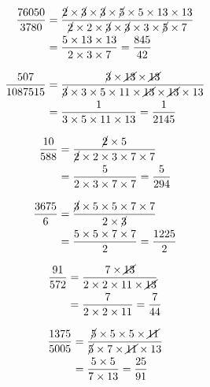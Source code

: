 {{\item\begin{align*}
    \frac{76050}{3780} &=
    \frac{\cancel{2} \times \cancel{3} \times \cancel{3} \times \cancel{5} \times 5 \times 13 \times 13}
    {\cancel{2} \times 2 \times \cancel{3} \times \cancel{3} \times 3 \times \cancel{5} \times 7}\\ &=
    \frac{5 \times 13 \times 13}
    {2 \times 3 \times 7} =
    \frac{845}{42}
    \end{align*}

\item\begin{align*}
    \frac{507}{1087515} &=
    \frac{\cancel{3} \times \cancel{13} \times \cancel{13}}
    {\cancel{3} \times 3 \times 5 \times 11 \times \cancel{13} \times \cancel{13} \times 13}\\ &=
    \frac{1}
    {3 \times 5 \times 11 \times 13} =
    \frac{1}{2145}
    \end{align*}

\item\begin{align*}
    \frac{10}{588} &=
    \frac{\cancel{2} \times 5}
    {\cancel{2} \times 2 \times 3 \times 7 \times 7}\\ &=
    \frac{5}
    {2 \times 3 \times 7 \times 7} =
    \frac{5}{294}
    \end{align*}

\item\begin{align*}
    \frac{3675}{6} &=
    \frac{\cancel{3} \times 5 \times 5 \times 7 \times 7}
    {2 \times \cancel{3}}\\ &=
    \frac{5 \times 5 \times 7 \times 7}
    {2} =
    \frac{1225}{2}
    \end{align*}

\item\begin{align*}
    \frac{91}{572} &=
    \frac{7 \times \cancel{13}}
    {2 \times 2 \times 11 \times \cancel{13}}\\ &=
    \frac{7}
    {2 \times 2 \times 11} =
    \frac{7}{44}
    \end{align*}

\item\begin{align*}
    \frac{1375}{5005} &=
    \frac{\cancel{5} \times 5 \times 5 \times \cancel{11}}
    {\cancel{5} \times 7 \times \cancel{11} \times 13}\\ &=
    \frac{5 \times 5}
    {7 \times 13} =
    \frac{25}{91}
    \end{align*}

}}
